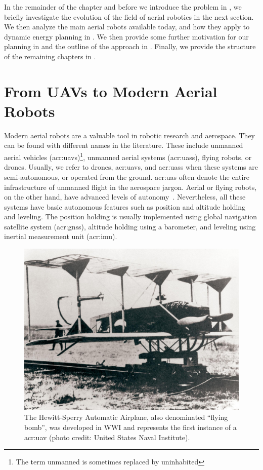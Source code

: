 In the remainder of the chapter and before we introduce the problem in , we briefly investigate the evolution of the field of aerial robotics in the next section. We then analyze the main aerial robots available today, and how they apply to dynamic energy planning in . We then provide some further motivation for our planning in  and the outline of the approach in . Finally, we provide the structure of the remaining chapters in .


\section{From UAVs to Modern Aerial Robots}

Modern aerial robots are a valuable tool in robotic research and aerospace. They can be found with different names in the literature. These include unmanned aerial vehicles (\Gls{acr:uav}s)\footnote{The term unmanned is sometimes replaced by uninhabited}, unmanned aerial systems (\Gls{acr:uas}s), flying robots, or drones. Usually, we refer to drones, \Gls{acr:uav}s, and \Gls{acr:uas}s when these systems are semi-autonomous, or operated from the ground. \Gls{acr:uas} often denote the entire infrastructure of unmanned flight in the aerospace jargon. Aerial or flying robots, on the other hand, have advanced levels of autonomy~\citep{siciliano2016springer}. Nevertheless, all these systems have basic autonomous features such as position and altitude holding and leveling. The position holding is usually implemented using global navigation satellite system (\Gls{acr:gnss}), altitude holding using a barometer, and leveling using inertial measurement unit (\Gls{acr:imu}).

\begin{figure}[t]
  \centering
  \includegraphics[width=.7\textwidth]{pictures/HA-NH-JA-19_1}
  \caption[Hewitt-Sperry Automatic Airplane, first unmanned flying machine]{The Hewitt-Sperry Automatic Airplane, also denominated ``flying bomb'', was developed in WWI and represents the first instance of a \Gls{acr:uav} {\scriptsize(photo credit: United States Naval Institute)}.}   
  \label{fig:hewitt-sperry}
\end{figure}

